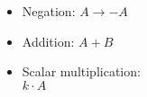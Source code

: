 \begin{itemize}
    \item Negation: $A \rightarrow -A$
    \item Addition: $A+B$
    \item Scalar multiplication: \\$k \cdot A$
\end{itemize}